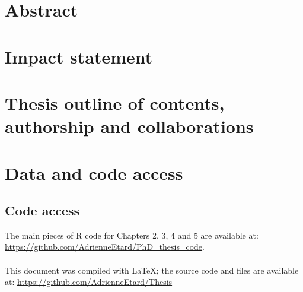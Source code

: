 \documentclass[11pt]{report}
\begin{document}
\begin{refsection}
\begin{comment}
To my friends in London and elsewhere who put up with my shenaniggans. In particular, Yumi \& Tom. To my family for their spirits and their support, Anne, Jean--François, Vivien, Octave \& Caroline.
 
And, last but not least, a very special thank to Tea Trains, Coffee Breaks \& Journal Club Cookies. 
\end{comment}

\chapter*{Abstract} %



\chapter*{Impact statement}%


\chapter*{Thesis outline of contents, authorship and collaborations}


\chapter*{Data and code access}

\section*{Code access}
The main pieces of R code for Chapters 2, 3, 4 and 5 are available at: \url{https://github.com/AdrienneEtard/PhD_thesis_code}.\\
\\
This document was compiled with {\LaTeX}; the source code and files are available at: \url{https://github.com/AdrienneEtard/Thesis}


\end{refsection}
\end{document}
